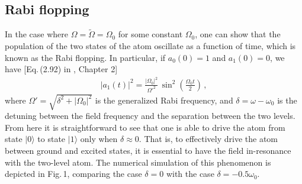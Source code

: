 \documentclass[reprint, amsmath, amssymb, aps]{revtex4-2}
\newcommand{\that}[1]{\widetilde{#1}}
\begin{document}
\subsection{Rabi flopping}
In the case where $\Omega = \that{\Omega} = \Omega_0$ for some constant $\Omega_0$, one can show \cite{Berman} that the population of the two states of the atom oscillate as a function of time, which is known as the Rabi flopping. In particular, if $a_0(0) = 1$ and $a_1(0) = 0$, we have [Eq.\,(2.92) in \cite{Berman}, Chapter 2] 
\begin{align}
|a_1(t)|^2 = \frac{|\Omega_0|^2}{\Omega'^2} \, \sin^2\left( \frac{\Omega_0 t}{2}\right)\,,
\end{align}
where $\Omega' = \sqrt{\delta^2 + |\Omega_0|^2}$ is the generalized Rabi frequency, and $\delta = \omega - \omega_0$ is the detuning between the field frequency and the separation between the two levels. From here it is straightforward to see that one is able to drive the atom from state $|0\rangle$ to state $|1\rangle$ only when $\delta \approx 0$. That is, to effectively drive the atom between ground and excited states, it is essential to have the field in-resonance with the two-level atom. The numerical simulation of this phenomenon is depicted in Fig.\,1, comparing the case $\delta = 0 $ with the case $\delta = -0.5\omega_0$. 
\end{document}
